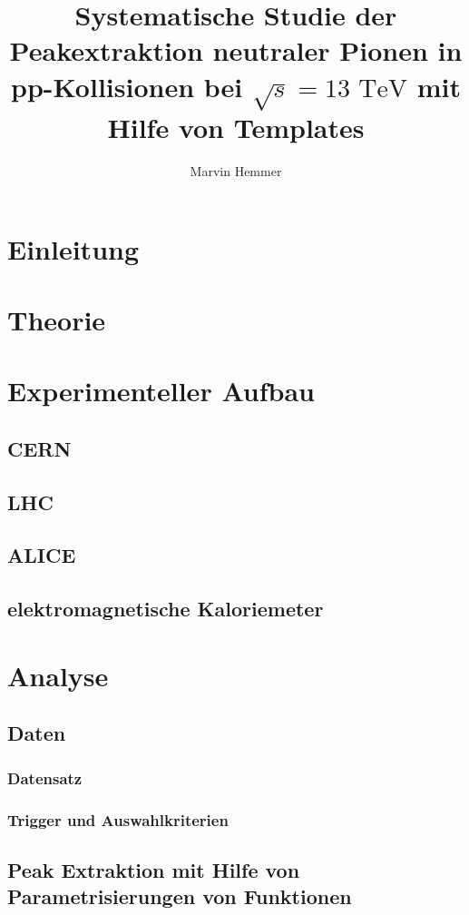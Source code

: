 \documentclass[11pt]{article}
\title{Systematische Studie der Peakextraktion neutraler Pionen in pp-Kollisionen bei $\sqrt{s}=13\text{ TeV}$ mit Hilfe von Templates}
\author{Marvin Hemmer}
\begin{document}
\maketitle
\newpage
\tableofcontents
\newpage

	\section*{Einleitung}
	\section{Theorie}

	\section{Experimenteller Aufbau}
	\subsection{CERN}
	\subsection{LHC}
	\subsection{ALICE}
	\subsection{elektromagnetische Kaloriemeter}

	\section{Analyse}
	\subsection{Daten}
	\subsubsection{Datensatz}
	\label{ssec:Datensatz}
	\subsubsection{Trigger und Auswahlkriterien}
	\subsection{Peak Extraktion mit Hilfe von Parametrisierungen von Funktionen}
\end{document}
